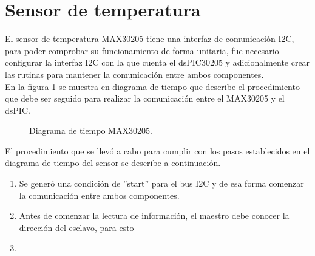 \section{Sensor de temperatura}

El sensor de temperatura MAX30205 tiene una interfaz de comunicación I2C, para poder comprobar su funcionamiento de forma unitaria, fue necesario configurar la interfaz I2C con la que cuenta el dsPIC30205 y adicionalmente crear las rutinas para mantener la comunicación entre ambos componentes.\\

En la figura \ref{fig:DiagramaMAX30205} se muestra en diagrama de tiempo que describe el procedimiento que debe ser seguido para realizar la comunicación entre el MAX30205 y el dsPIC.\\


\begin{figure}[htbp!]
	\centering
	\caption{Diagrama de tiempo MAX30205.}
	\label{fig:DiagramaMAX30205}
\end{figure}

El procedimiento que se llevó a cabo para cumplir con los pasos establecidos en el diagrama de tiempo del sensor se describe a continuación.

\begin{enumerate}
	\item Se generó una condición de ''start'' para el bus I2C y de esa forma comenzar la comunicación entre ambos componentes.
	\item Antes de comenzar la lectura de información, el maestro debe conocer la dirección del esclavo, para esto
	\item  
\end{enumerate}



